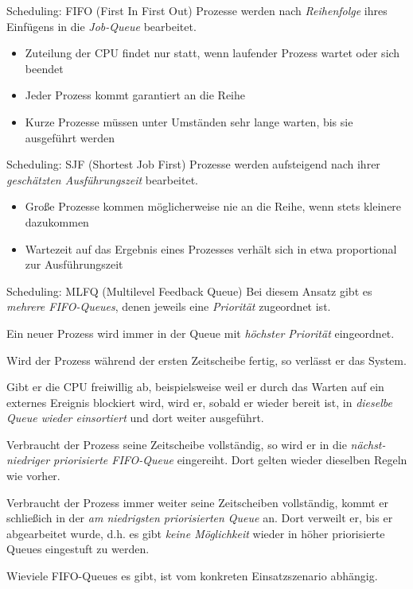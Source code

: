 \begin{algo}{Scheduling: FIFO (First In First Out)}
    Prozesse werden nach \emph{Reihenfolge} ihres Einfügens in die \emph{Job-Queue} bearbeitet.
    \begin{itemize}
        \item Zuteilung der CPU findet nur statt, wenn laufender Prozess wartet oder sich beendet
        \item Jeder Prozess kommt garantiert an die Reihe
        \item Kurze Prozesse müssen unter Umständen sehr lange warten, bis sie ausgeführt werden
    \end{itemize}
\end{algo}

\begin{algo}{Scheduling: SJF (Shortest Job First)}
    Prozesse werden aufsteigend nach ihrer \emph{geschätzten Ausführungszeit} bearbeitet.
    \begin{itemize}
        \item Große Prozesse kommen möglicherweise nie an die Reihe, wenn stets kleinere dazukommen
        \item Wartezeit auf das Ergebnis eines Prozesses verhält sich in etwa proportional zur Ausführungszeit
    \end{itemize}
\end{algo}

\begin{algo}{Scheduling: MLFQ (Multilevel Feedback Queue)}
    Bei diesem Ansatz gibt es \emph{mehrere FIFO-Queues}, denen jeweils
    eine \emph{Priorität} zugeordnet ist.

    Ein neuer Prozess wird immer in der Queue mit
    \emph{höchster Priorität} eingeordnet.

    Wird der Prozess während der ersten Zeitscheibe fertig,
    so verlässt er das System.

    Gibt er die CPU freiwillig ab, beispielsweise weil er
    durch das Warten auf ein externes Ereignis blockiert wird, wird er, sobald er wieder
    bereit ist, in \emph{dieselbe Queue wieder einsortiert} und dort weiter ausgeführt.

    Verbraucht der Prozess seine Zeitscheibe vollständig, so wird er in die \emph{nächst-niedriger priorisierte FIFO-Queue} eingereiht. Dort gelten wieder dieselben Regeln wie vorher.

    Verbraucht der Prozess immer weiter seine Zeitscheiben vollständig, kommt er
    schließich in der \emph{am niedrigsten priorisierten Queue} an.
    Dort verweilt er, bis er abgearbeitet wurde, d.h. es gibt \emph{keine Möglichkeit} wieder in höher priorisierte Queues
    eingestuft zu werden.

    Wieviele FIFO-Queues es gibt, ist vom konkreten Einsatzszenario abhängig.
\end{algo}

